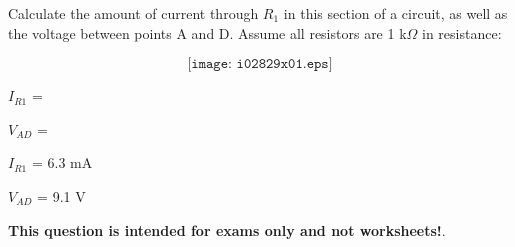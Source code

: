 

Calculate the amount of current through $R_1$ in this section of a circuit, as well as the voltage between points A and D.  Assume all resistors are 1 k$\Omega$ in resistance:

$$\texttt{[image: i02829x01.eps]}$$

$I_{R1}$ = 

\vskip 10pt

$V_{AD}$ = 

\vskip 10pt







$I_{R1}$ = 6.3 mA

\vskip 10pt

$V_{AD}$ = 9.1 V







{\bf This question is intended for exams only and not worksheets!}.


